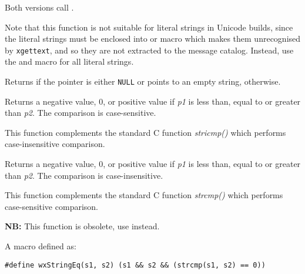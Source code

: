 Both versions call .

Note that this function is not suitable for literal strings in Unicode
builds, since the literal strings must be enclosed into
 or  macro which makes them
unrecognised by \texttt{xgettext}, and so they are not extracted to the message
catalog. Instead, use the  and
 macro for all literal strings.


\label{wxisempty}


Returns \true if the pointer is either {\tt NULL} or points to an empty
string, \false otherwise.


\label{wxstrcmp}


Returns a negative value, 0, or positive value if {\it p1} is less than, equal
to or greater than {\it p2}. The comparison is case-sensitive.

This function complements the standard C function {\it stricmp()} which performs
case-insensitive comparison.


\label{wxstricmp}


Returns a negative value, 0, or positive value if {\it p1} is less than, equal
to or greater than {\it p2}. The comparison is case-insensitive.

This function complements the standard C function {\it strcmp()} which performs
case-sensitive comparison.


\label{wxstringeq}


{\bf NB:} This function is obsolete, use  instead.

A macro defined as:

\begin{verbatim}
#define wxStringEq(s1, s2) (s1 && s2 && (strcmp(s1, s2) == 0))
\end{verbatim}


\label{wxstringmatch}

